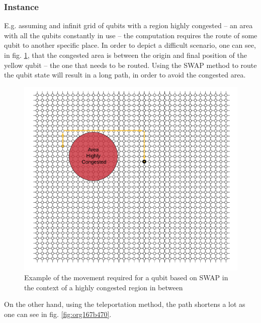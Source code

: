 \documentclass[11pt]{article}
\begin{document}
\subsubsection{Instance}
\label{sec:org287e669}

E.g. assuming and infinit grid of qubits with a region highly congested -- an area with all the qubits constantly in use -- the computation requires the route of some qubit to another specific place.
In order to depict a difficult scenario, one can see, in fig. \ref{fig:org5b810a8}, that the congested area is between the origin and final position of the yellow qubit -- the one that needs to be routed.
Using the SWAP method to route the qubit state will result in a long path, in order to avoid the congested area.

\begin{figure}[htbp]
\centering
\includegraphics[width=\textwidth]{Teletransmission1.png}
\caption{\label{fig:org5b810a8}
Example of the movement required for a qubit based on SWAP in the context of a highly congested region in between}
\end{figure}

On the other hand, using the teleportation method, the path shortens a lot as one can see in fig. \ref{fig:org167b470}.
\end{document}
